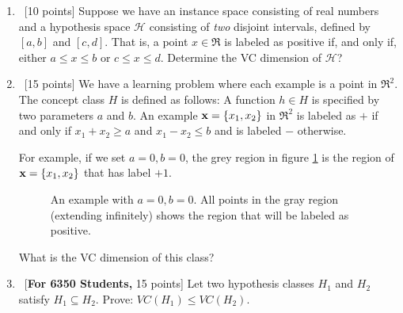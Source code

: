 \begin{enumerate}
\item ~[10 points] Suppose we have an instance space consisting of
  real numbers and a hypothesis space $\mathcal{H}$ consisting of {\em
    two} disjoint intervals, defined by $[a, b]$ and $[c, d]$. That
  is, a point $x \in \Re$ is labeled as positive if, and only if,
  either $a \leq x \leq b$ or $c \leq x \leq d$. Determine the VC
  dimension of $\mathcal{H}$?


\item ~[15 points] We have a learning problem where each example is a
  point in $\Re^2$. The concept class $H$ is defined as follows: A
  function $h \in H$ is specified by two parameters $a$ and $b$. An
  example ${\bf x} = \{x_1, x_2\}$ in $\Re^2$ is labeled as $+$ if and
  only if $x_1 + x_2 \geq a$ and $x_1 - x_2 \leq b$ and is labeled $-$
  otherwise.

  For example, if we set $a = 0, b = 0$, the grey region in figure
  \ref{f1} is the region of ${\bf x} = \{x_1, x_2\}$ that has label
  $+1$.

  \begin{figure}[h!]
    \centering
    \caption{An example with $a = 0, b = 0$. All points in the gray region
      (extending infinitely) shows the region that will be labeled as
      positive.} \label{f1}
  \end{figure}



  What is the VC dimension of this class?


\item ~[{\bf For 6350 Students,} 15 points] Let two hypothesis classes
  $H_1$ and $H_2$ satisfy $H_1 \subseteq H_2$. Prove: $VC(H_1) \leq
  VC(H_2)$.

\end{enumerate}
